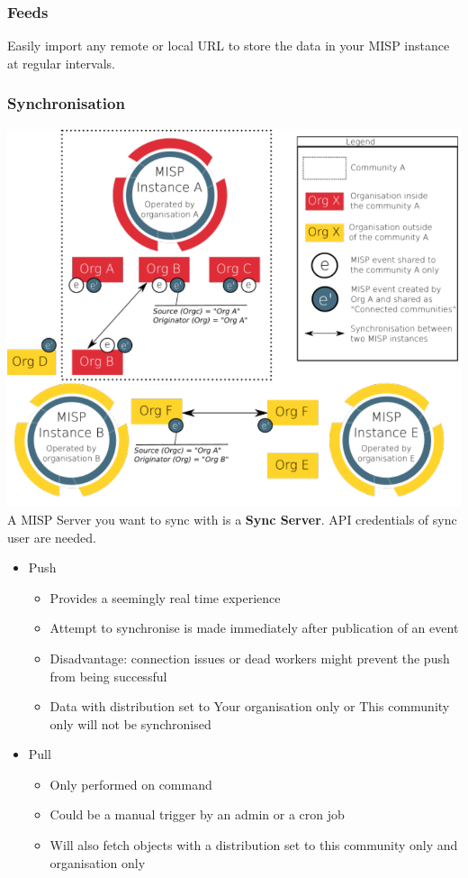 \subsubsection{Feeds}
Easily import any remote or local URL to store the data in your MISP instance at regular intervals.
\subsubsection{Synchronisation}
\includegraphics[width=\linewidth]{./img/15-misp/misp_synchronisation.png}
A MISP Server you want to sync with is a \textbf{Sync Server}. API credentials of sync user are needed.
\begin{itemize}
    \item Push
    \begin{itemize}
        \item Provides a seemingly real time experience
        \item Attempt to synchronise is made immediately after publication of an event
        \item Disadvantage: connection issues or dead workers might prevent the push from being successful
        \item Data with distribution set to Your organisation only or This community only will not be synchronised
    \end{itemize}
    \item Pull
    \begin{itemize}
        \item Only performed on command
        \item Could be a manual trigger by an admin or a cron job
        \item Will also fetch objects with a distribution set to this community only and organisation only
       
    \end{itemize}
\end{itemize}
